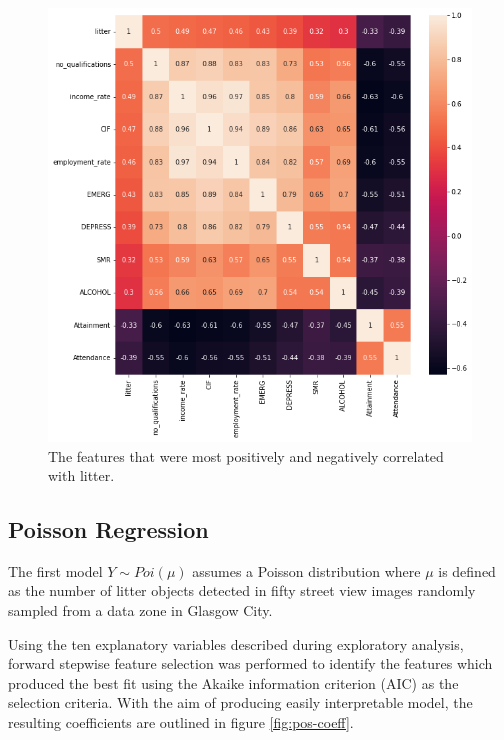 \documentclass{thesis}
\begin{document}
\begin{figure}[h]
    \centering
    \includegraphics[scale=0.5]{images/corr-matrix.png}
    \caption{The features that were most positively and negatively correlated with litter.}
    \label{fig:correlation-matrix}
\end{figure}



\subsection{Poisson Regression}

The first model $Y \sim Poi(\mu)$ assumes a Poisson distribution where $\mu$ is defined as the number of litter objects detected in fifty street view images randomly sampled from a data zone in Glasgow City.

Using the ten explanatory variables described during exploratory analysis, forward stepwise feature selection was performed to identify the features which produced the best fit using the Akaike information criterion (AIC) as the selection criteria. With the aim of producing easily interpretable model, the resulting coefficients are outlined in figure \ref{fig:pos-coeff}.
\end{document}
